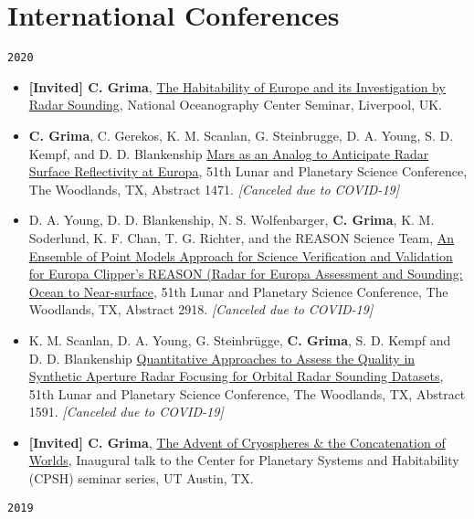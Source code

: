 \section*{International Conferences}


\texttt{2020}

\begin{itemize}
\item
  \textbf{{[}Invited{]} C. Grima}, \href{https://noc.ac.uk/seminars/liverpool/habitability-europe-its-investigation-radar-sounding}{The Habitability of Europe and its Investigation by Radar Sounding}, National Oceanography Center Seminar, Liverpool, UK.
\item
  \textbf{C. Grima}, C. Gerekos,  K. M. Scanlan,  G. Steinbrugge, D. A. Young, S. D. Kempf, and D. D. Blankenship \href{https://www.hou.usra.edu/meetings/lpsc2020/pdf/1471.pdf}{Mars as an Analog to Anticipate Radar Surface Reflectivity at Europa}, 51th Lunar and Planetary Science Conference, The Woodlands, TX, Abstract 1471. \emph{[Canceled due to COVID-19]}
\item
  D. A. Young, D. D. Blankenship, N. S. Wolfenbarger, \textbf{C. Grima}, K. M. Soderlund, K. F. Chan, T. G. Richter, and the REASON Science Team, \href{https://www.hou.usra.edu/meetings/lpsc2020/pdf/2918.pdf}{An Ensemble of Point Models Approach for Science Verification and Validation for Europa Clipper's REASON (Radar for Europa Assessment and Sounding: Ocean to Near-surface}, 51th Lunar and Planetary Science Conference, The Woodlands, TX, Abstract 2918. \emph{[Canceled due to COVID-19]}
\item
  K. M. Scanlan, D. A. Young, G. Steinbrügge, \textbf{C. Grima},  S.  D.  Kempf and  D. D. Blankenship \href{https://www.hou.usra.edu/meetings/lpsc2020/pdf/1591.pdf}{Quantitative Approaches to Assess the Quality in Synthetic Aperture Radar Focusing for Orbital Radar Sounding Datasets}, 51th Lunar and Planetary Science Conference, The Woodlands, TX, Abstract 1591. \emph{[Canceled due to COVID-19]}
\item
  \textbf{{[}Invited{]} C. Grima}, \href{https://}{The Advent of Cryospheres \& the Concatenation of Worlds}, Inaugural talk to the Center for Planetary Systems and Habitability (CPSH) seminar series, UT Austin, TX.
\end{itemize}


\texttt{2019}

